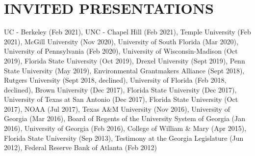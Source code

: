 \documentclass[letterpaper,11pt]{article}
\begin{document}
\section{INVITED PRESENTATIONS}
UC - Berkeley (Feb 2021), UNC - Chapel Hill (Feb 2021), Temple University (Feb 2021), McGill University (Nov 2020), University of South Florida (Mar 2020), University of Pennsylvania (Feb 2020), University of Wisconsin-Madison (Oct 2019), Florida State University (Oct 2019), Drexel University (Sept 2019), Penn State University (May 2019), Environmental Grantmakers Alliance (Sept 2018), Rutgers University (Sept 2018, declined), University of Florida (Feb 2018, declined), Brown University (Dec 2017), Florida State University (Dec 2017), University of Texas at San Antonio (Dec 2017), Florida State University (Oct 2017), NOAA (Jul 2017), Texas A\&M University (Nov 2016), University of Georgia (Mar 2016), Board of Regents of the University System of Georgia (Jan 2016), University of Georgia (Feb 2016), College of William \& Mary (Apr 2015), Florida State University (Sep 2013), Testimony at the Georgia Legislature (Jun 2012), Federal Reserve Bank of Atlanta (Feb 2012)
\end{document}

